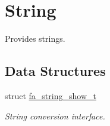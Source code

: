 \hypertarget{group___fa_string}{\section{String}
\label{group___fa_string}
}


Provides strings.  


\subsection*{Data Structures}
\begin{DoxyCompactItemize}
\item 
struct \hyperlink{structfa__string__show__t}{fa\-\_\-string\-\_\-show\-\_\-t}
\begin{DoxyCompactList}\small\item\em String conversion interface. \end{DoxyCompactList}\end{DoxyCompactItemize}
